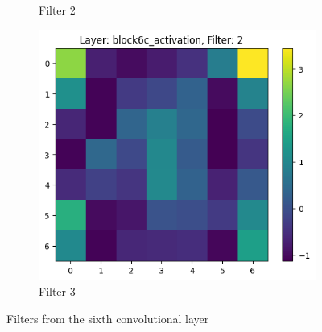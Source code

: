 \begin{figure}[h]
\begin{subfigure}[b]{0.3\textwidth}
        \caption{Filter 2}
        \label{fig:filter2}
    \end{subfigure}
    \begin{subfigure}[b]{0.3\textwidth}
        \centering
        \includegraphics[width=\textwidth]{images/filter 2block6a_activation.png}
        \caption{Filter 3}
        \label{fig:filter3}
    \end{subfigure}
    \caption{Filters from the sixth convolutional layer}
    \label{fig:conv_filters}
\end{figure}

